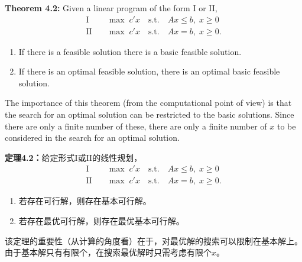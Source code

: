 \begin{original}
\textbf{Theorem 4.2:} Given a linear program of the form I or II,
\[
\begin{aligned}
\text{I} \quad & \max \; c'x \quad \text{s.t.} \quad Ax \le b,\; x \ge 0 \\
\text{II} \quad & \max \; c'x \quad \text{s.t.} \quad Ax = b,\; x \ge 0.
\end{aligned}
\]
\begin{enumerate}
\item If there is a feasible solution there is a basic feasible solution.
\item If there is an optimal feasible solution, there is an optimal basic feasible solution.
\end{enumerate}

The importance of this theorem (from the computational point of view) is that the search for an optimal solution can be restricted to the basic solutions. Since there are only a finite number of these, there are only a finite number of $x$ to be considered in the search for an optimal solution.
\end{original}
\begin{translation}
\textbf{定理4.2：}给定形式I或II的线性规划，
\[
\begin{aligned}
\text{I} \quad & \max \; c'x \quad \text{s.t.} \quad Ax \le b,\; x \ge 0 \\
\text{II} \quad & \max \; c'x \quad \text{s.t.} \quad Ax = b,\; x \ge 0.
\end{aligned}
\]
\begin{enumerate}
\item 若存在可行解，则存在基本可行解。
\item 若存在最优可行解，则存在最优基本可行解。
\end{enumerate}

该定理的重要性（从计算的角度看）在于，对最优解的搜索可以限制在基本解上。由于基本解只有有限个，在搜索最优解时只需考虑有限个$x$。
\end{translation}

